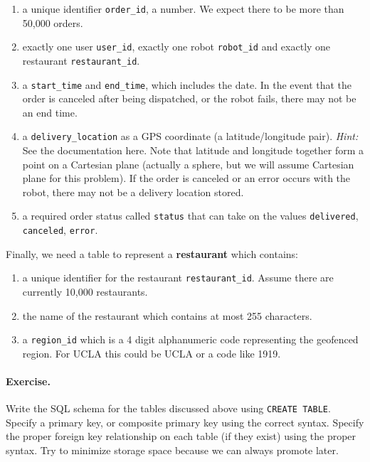 \documentclass{report}
\renewcommand{\it}[1]{\textit{{#1}}}
\renewcommand{\bf}[1]{\textbf{{#1}}}
\renewcommand{\tt}[1]{\texttt{{#1}}}
\begin{document}
\begin{enumerate} 
    \item a unique identifier \tt{order\_id}, a number. We expect there to be more than 50,000
        orders. 
    \item exactly one user \tt{user\_id}, exactly one robot \tt{robot\_id} and exactly one
        restaurant \tt{restaurant\_id}. 
    \item a \tt{start\_time} and \tt{end\_time}, which includes the date. In the event that the
        order is canceled after being dispatched, or the robot fails, there may not be an end time.
    \item a \tt{delivery\_location} as a GPS coordinate (a latitude/longitude pair). \it{Hint:} See
        the documentation here. Note that latitude and longitude together form a point on a
        Cartesian plane (actually a sphere, but we will assume Cartesian plane for this problem). If
        the order is canceled or an error occurs with the robot, there may not be a delivery
        location stored. 
    \item a required order status called \tt{status} that can take on the values \tt{delivered},
        \tt{canceled}, \tt{error}. 
\end{enumerate}

\noindent Finally, we need a table to represent a \bf{restaurant} which contains:

\begin{enumerate} 
    \item a unique identifier for the restaurant \tt{restaurant\_id}. Assume there are currently
        10,000 restaurants. 
    \item the name of the restaurant which contains at most 255 characters. 
    \item a \tt{region\_id} which is a 4 digit alphanumeric code representing the geofenced region.
        For UCLA this could be UCLA or a code like 1919. 
\end{enumerate}

\paragraph{Exercise.} Write the SQL schema for the tables discussed above using \tt{CREATE TABLE}.
Specify a primary key, or composite primary key using the correct syntax. Specify the proper foreign
key relationship on each table (if they exist) using the proper syntax. Try to minimize storage
space because we can always promote later.
\end{document}
